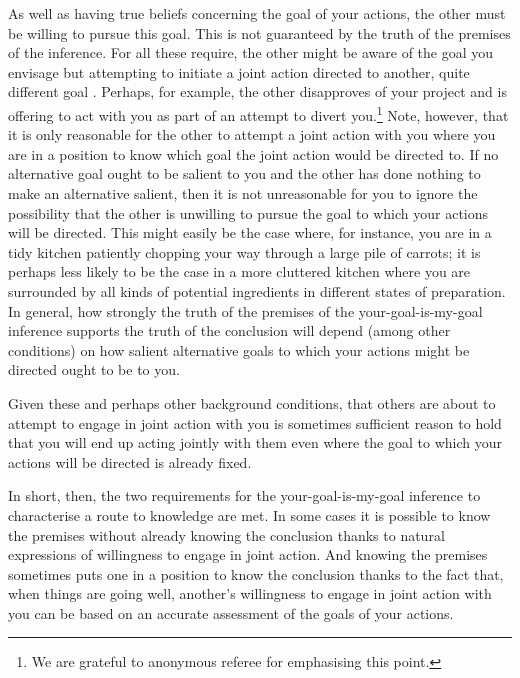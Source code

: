 \documentclass[12pt,\papersize]{extarticle}
\begin{document}
As well as having true beliefs concerning the goal of your actions, the other must be willing to pursue this goal. 
This is not guaranteed by the truth of the premises of the inference. 
For all these require, the other might be aware of the goal you envisage but attempting to initiate a joint action directed to another, quite different goal%
.  
Perhaps, for example, the other disapproves of your project and is offering to act with you as part of an attempt to divert you.\footnote{
We are grateful to anonymous referee for emphasising this point.
}
Note, however, that it is only reasonable for the other to attempt a joint action with you where you are in a position to know which goal the joint action would be directed to. 
If no alternative goal ought to be salient to you and the other has done nothing to make an alternative salient, then it is not unreasonable for you to ignore the possibility that the other is unwilling to pursue the goal to which your actions will be directed. 
This might easily be the case where, for instance, you are in a tidy kitchen patiently chopping your way through a large pile of carrots; it is perhaps less likely to be the case in a more cluttered kitchen where you are surrounded by all kinds of potential ingredients in different states of preparation. 
In general, how strongly the truth of the premises of the your-goal-is-my-goal inference supports the truth of the conclusion will depend (among other conditions) on how salient alternative goals to which your actions might be directed ought to be to you.

Given these and perhaps other background conditions,
that others are about to attempt to engage in joint action with you 
is sometimes sufficient reason to hold that
you will end up acting jointly with them
 even where the goal to which your actions will be directed is already fixed.

In short, then, the two requirements for the your-goal-is-my-goal inference to characterise a route to knowledge are met.  
In some cases it is possible to know the premises without already knowing the conclusion thanks to natural expressions of willingness to engage in joint action.  
And knowing the premises sometimes puts one in a position to know the conclusion thanks to the fact that, when things are going well, another's willingness to engage in joint action with you can be based on an accurate assessment of the goals of your actions.
\end{document}
